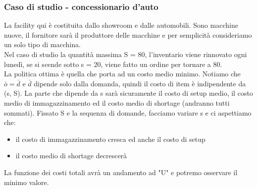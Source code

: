 \documentclass{article}
\begin{document}
\subsubsection{Caso di studio - concessionario d'auto}
La facility qui è costituita dallo showroom e dalle automobili. Sono macchine nuove, il fornitore sarà il produttore delle macchine e per semplicità consideriamo un solo tipo di macchina.\\ Nel caso di studio la quantità massima S = 80, l'inventario viene rinnovato ogni lunedì, se si scende sotto s = 20, viene fatto un ordine per tornare a 80.\\ La politica ottima è quella che porta ad un costo medio minimo. Notiamo che $\bar{o} = \bar{d}$ e $\bar{d}$ dipende solo dalla domanda, quindi il costo di item è indipendente da (s, S). La parte che dipende da s sarà sicuramente il costo di setup medio, il costo medio di immagazzinamento ed il costo medio di shortage (andranno tutti sommati). Fissato S e la sequenza di domande, facciamo variare s e ci aspettiamo che:
\begin{itemize}
\item il costo di immagazzinamento cresca ed anche il costo di setup
\item il costo medio di shortage decrescerà
\end{itemize}
La funzione dei costi totali avrà un andamento ad "U" e potremo osservare il minimo valore.
\end{document}
